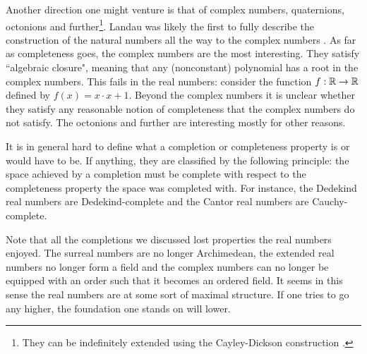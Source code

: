 \documentclass[../main.tex]{subfiles}
\begin{document}
Another direction one might venture is that of complex numbers, quaternions, octonions and further\footnote{They can be indefinitely extended using the Cayley-Dickson construction \cite{Dickson1919}.}. Landau was likely the first to fully describe the construction of the natural numbers all the way to the complex numbers \cite{Landau1930}. As far as completeness goes, the complex numbers are the most interesting. They satisfy ``algebraic closure", meaning that any (nonconstant) polynomial has a root in the complex numbers. This fails in the real numbers: consider the function $f:\mathbb{R}\to\mathbb{R}$ defined by $f(x)=x\cdot x+1$. Beyond the complex numbers it is unclear whether they satisfy any reasonable notion of completeness that the complex numbers do not satisfy. The octonions and further are interesting mostly for other reasons.

It is in general hard to define what a completion or completeness property is or would have to be. If anything, they are classified by the following principle: the space achieved by a completion must be complete with respect to the completeness property the space was completed with. For instance, the Dedekind real numbers are Dedekind-complete and the Cantor real numbers are Cauchy-complete.

Note that all the completions we discussed lost properties the real numbers enjoyed. The surreal numbers are no longer Archimedean, the extended real numbers no longer form a field and the complex numbers can no longer be equipped with an order such that it becomes an ordered field. It seems in this sense the real numbers are at some sort of maximal structure. If one tries to go any higher, the foundation one stands on will lower.
\end{document}
